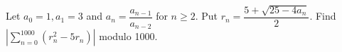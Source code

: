 Let $a_0=1,a_1=3$ and $a_n = \dfrac{a_{n-1}}{a_{n-2}}$ for $n\ge2$. Put $r_n = \dfrac{5+\sqrt{25-4a_n}}{2}$. Find $|\sum_{n=0}^{1000}(r_n^2-5r_n)|$ modulo 1000.
